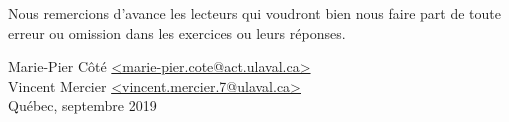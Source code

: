Nous remercions d'avance les lecteurs qui voudront bien nous faire part de toute erreur ou omission dans les exercices ou leurs réponses.


\begin{flushright}
  Marie-Pier Côté \url{<marie-pier.cote@act.ulaval.ca>} \\
  Vincent Mercier \url{<vincent.mercier.7@ulaval.ca>} \\
  Québec, septembre 2019
\end{flushright}

